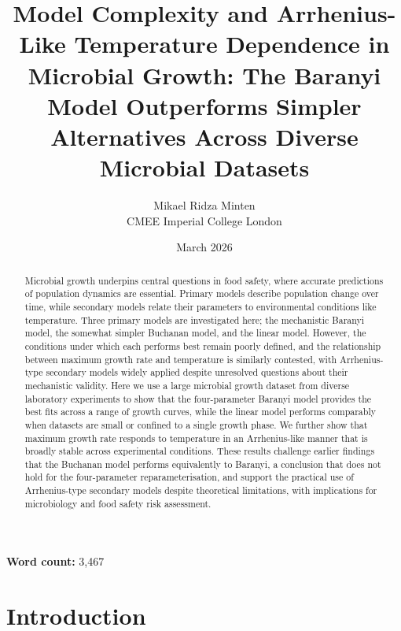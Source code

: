 \documentclass[11pt]{article}
\title{Model Complexity and Arrhenius-Like Temperature Dependence in Microbial Growth: The Baranyi Model Outperforms Simpler Alternatives Across Diverse Microbial Datasets}
\author{Mikael Ridza Minten \\ \small CMEE Imperial College London}
\date{March 2026}  %
\begin{document}
\begin{titlingpage}
  \maketitle
  \vspace{1cm}
  \begin{center}
    \textbf{Word count:} 3{,}467
  \end{center}
\end{titlingpage}

\begin{abstract}

Microbial growth underpins central questions in food safety, where accurate 
predictions of population dynamics are essential. Primary models describe population 
change over time, while secondary models relate their parameters to environmental conditions 
like temperature. Three primary models are investigated here; the mechanistic Baranyi model, the somewhat simpler Buchanan
model, and the linear model. However, the conditions under which each performs best 
remain poorly defined, and the relationship between maximum growth rate and temperature is 
similarly contested, with Arrhenius-type secondary models widely applied despite unresolved 
questions about their mechanistic validity. Here we use a large microbial growth dataset  from diverse laboratory experiments to show that the four-parameter Baranyi model 
provides the best fits across a range of growth curves, while the linear model performs 
comparably when datasets are small or confined to a single growth phase. We further show 
that maximum growth rate responds to temperature in an Arrhenius-like manner that is broadly 
stable across experimental conditions. These results challenge earlier findings that the 
Buchanan model performs equivalently to Baranyi, a conclusion that does not hold for the 
four-parameter reparameterisation, and support the practical use of Arrhenius-type secondary 
models despite theoretical limitations, with implications for microbiology 
and food safety risk assessment.



\end{abstract}
\newpage
\modulolinenumbers[5]
\linenumbers

\onehalfspacing


\section{Introduction}
\end{document}

